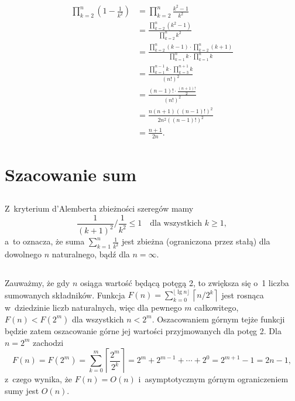 \subsection{} %
\begin{align*}
	\prod_{k=2}^n\left(1-\frac{1}{k^2}\right) &= \prod_{k=2}^n\frac{k^2-1}{k^2} \\
	&= \frac{\prod_{k=2}^n(k^2-1)}{\prod_{k=2}^nk^2} \\
	&= \frac{\prod_{k=2}^n(k-1)\cdot\prod_{k=2}^n(k+1)}{\prod_{k=1}^nk\cdot\prod_{k=1}^nk} \\
	&= \frac{\prod_{k=1}^{n-1}k\cdot\prod_{k=3}^{n+1}k}{(n!)^2} \\
	&= \frac{(n-1)!\cdot\frac{(n+1)!}{2}}{(n!)^2} \\
	&= \frac{n(n+1)((n-1)!)^2}{2n^2((n-1)!)^2} \\
	&= \frac{n+1}{2n}.
\end{align*}

\section{Szacowanie sum}

\subsection{} %
Z~kryterium d'Alemberta zbieżności szeregów mamy
\[
	\frac{1}{(k+1)^2}\bigg/\frac{1}{k^2} \le 1 \quad\text{dla wszystkich $k\ge1$},
\]
a~to oznacza, że suma $\sum_{k=1}^n\frac{1}{k^2}$ jest zbieżna (ograniczona przez stałą) dla dowolnego $n$ naturalnego, bądź dla $n=\infty$.

\subsection{} %
Zauważmy, że gdy $n$ osiąga wartość będącą potęgą 2, to zwiększa się o~1 liczba sumowanych składników. Funkcja $F(n)=\sum_{k=0}^{\lfloor\lg n\rfloor}\left\lceil n/2^k\right\rceil$ jest rosnąca w~dziedzinie liczb naturalnych, więc dla pewnego $m$ całkowitego, $F(n)<F(2^m)$ dla wszystkich $n<2^m$. Oszacowaniem górnym tejże funkcji będzie zatem oszacowanie górne jej wartości przyjmowanych dla potęg 2. Dla $n=2^m$ zachodzi
\[
	F(n) = F(2^m) = \sum_{k=0}^m\left\lceil\frac{2^m}{2^k}\right\rceil = 2^m+2^{m-1}+\cdots+2^0 = 2^{m+1}-1 = 2n-1,
\]
z~czego wynika, że $F(n)=O(n)$ i~asymptotycznym górnym ograniczeniem sumy jest $O(n)$.


